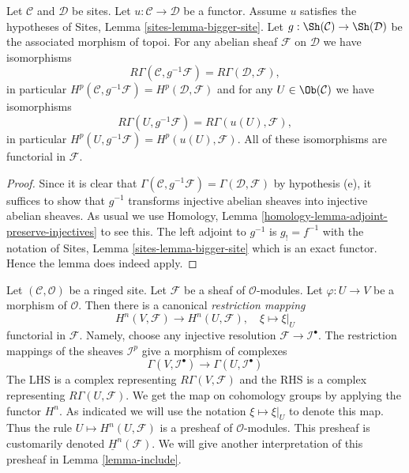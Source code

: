 \begin{lemma}
\label{lemma-cohomology-bigger-site}
Let $\mathcal{C}$ and $\mathcal{D}$ be sites.
Let $u : \mathcal{C} \to \mathcal{D}$ be a functor.
Assume $u$ satisfies the hypotheses of
Sites, Lemma \ref{sites-lemma-bigger-site}.
Let $g : \Sh(\mathcal{C}) \to \Sh(\mathcal{D})$
be the associated morphism of topoi.
For any abelian sheaf $\mathcal{F}$ on $\mathcal{D}$ we have
isomorphisms
$$
R\Gamma(\mathcal{C}, g^{-1}\mathcal{F}) = R\Gamma(\mathcal{D}, \mathcal{F}),
$$
in particular
$H^p(\mathcal{C}, g^{-1}\mathcal{F}) = H^p(\mathcal{D}, \mathcal{F})$
and for any $U \in \Ob(\mathcal{C})$ we have isomorphisms
$$
R\Gamma(U, g^{-1}\mathcal{F}) = R\Gamma(u(U), \mathcal{F}),
$$
in particular
$H^p(U, g^{-1}\mathcal{F}) = H^p(u(U), \mathcal{F})$. All of these
isomorphisms are functorial in $\mathcal{F}$.
\end{lemma}

\begin{proof}
Since it is clear that
$\Gamma(\mathcal{C}, g^{-1}\mathcal{F}) = \Gamma(\mathcal{D}, \mathcal{F})$
by hypothesis (e), it suffices to show that $g^{-1}$ transforms injective
abelian sheaves into injective abelian sheaves. As usual we use
Homology, Lemma \ref{homology-lemma-adjoint-preserve-injectives}
to see this. The left adjoint to $g^{-1}$ is $g_! = f^{-1}$ with the
notation of
Sites, Lemma \ref{sites-lemma-bigger-site}
which is an exact functor. Hence the lemma does indeed apply.
\end{proof}

\noindent
Let $(\mathcal{C}, \mathcal{O})$ be a ringed site.
Let $\mathcal{F}$ be a sheaf of $\mathcal{O}$-modules.
Let $\varphi : U \to V$ be a morphism of $\mathcal{O}$.
Then there is a canonical {\it restriction mapping}
\begin{equation}
\label{equation-restriction-mapping}
H^n(V, \mathcal{F})
\longrightarrow
H^n(U, \mathcal{F}), \quad
\xi \longmapsto \xi|_U
\end{equation}
functorial in $\mathcal{F}$. Namely, choose any injective
resolution $\mathcal{F} \to \mathcal{I}^\bullet$. The restriction
mappings of the sheaves $\mathcal{I}^p$ give a morphism of complexes
$$
\Gamma(V, \mathcal{I}^\bullet)
\longrightarrow
\Gamma(U, \mathcal{I}^\bullet)
$$
The LHS is a complex representing $R\Gamma(V, \mathcal{F})$
and the RHS is a complex representing $R\Gamma(U, \mathcal{F})$.
We get the map on cohomology groups by applying the functor $H^n$.
As indicated we will use the notation $\xi \mapsto \xi|_U$ to denote this map.
Thus the rule $U \mapsto H^n(U, \mathcal{F})$ is a presheaf of
$\mathcal{O}$-modules. This presheaf is customarily denoted
$\underline{H}^n(\mathcal{F})$. We will give another interpretation
of this presheaf in Lemma \ref{lemma-include}.


